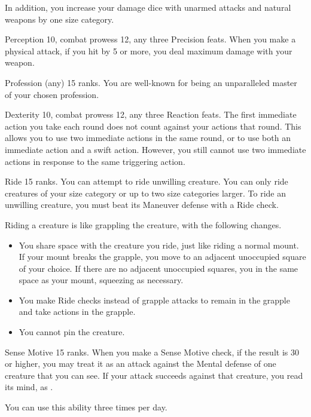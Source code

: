 In addition, you increase your damage dice with unarmed attacks and natural weapons by one size category.

\featpres Perception 10, combat prowess 12, any three Precision feats.
\featben When you make a physical attack, if you hit by 5 or more, you deal maximum damage with your weapon.

\featpre Profession (any) 15 ranks.
\featben You are well-known for being an unparalleled master of your chosen profession.

\featpres Dexterity 10, combat prowess 12, any three Reaction feats.
\featben The first immediate action you take each round does not count against your actions that round.
This allows you to use two immediate actions in the same round, or to use both an immediate action and a swift action.
However, you still cannot use two immediate actions in response to the same triggering action.

\featpre Ride 15 ranks.
\featben You can attempt to ride unwilling creature.
You can only ride creatures of your size category or up to two size categories larger.
To ride an unwilling creature, you must beat its Maneuver defense with a Ride check.

Riding a creature is like grappling the creature, with the following changes.
\begin{itemize}
    \item You share space with the creature you ride, just like riding a normal mount.
        If your mount breaks the grapple, you move to an adjacent unoccupied square of your choice.
        If there are no adjacent unoccupied squares, you in the same space as your mount, squeezing as necessary.
    \item You make Ride checks instead of grapple attacks to remain in the grapple and take actions in the grapple.
    \item You cannot pin the creature.
\end{itemize}

\featpre Sense Motive 15 ranks.
\featben When you make a Sense Motive check, if the result is 30 or higher, you may treat it as an attack against the Mental defense of one creature that you can see.
If your attack succeeds against that creature, you read its mind, as .

You can use this ability three times per day.

